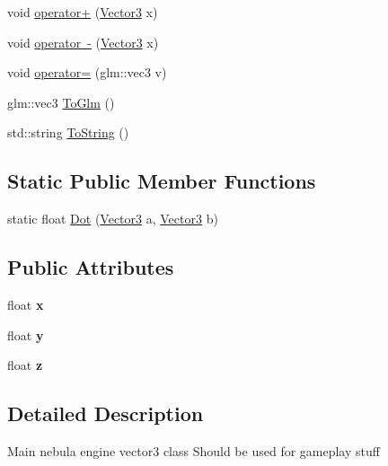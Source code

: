 \begin{DoxyCompactItemize}
\item 
void \mbox{\hyperlink{struct_vector3_a52897becbe532cb731a0117affac5ebe}{operator+}} (\mbox{\hyperlink{struct_vector3}{Vector3}} x)
\item 
void \mbox{\hyperlink{struct_vector3_aa3d4507c8c4a280d49919f1944999406}{operator -\/}} (\mbox{\hyperlink{struct_vector3}{Vector3}} x)
\item 
void \mbox{\hyperlink{struct_vector3_a11cb73f45e746e16397d4a0496d107a5}{operator=}} (glm\+::vec3 v)
\item 
glm\+::vec3 \mbox{\hyperlink{struct_vector3_a6ab2d064413018bcdfbd9d56e69d10a2}{To\+Glm}} ()
\item 
std\+::string \mbox{\hyperlink{struct_vector3_a331c8e16800919307bc3e8507f9459df}{To\+String}} ()
\end{DoxyCompactItemize}
\subsection*{Static Public Member Functions}
\begin{DoxyCompactItemize}
\item 
static float \mbox{\hyperlink{struct_vector3_abc6241be068bbf878c7b12b16582a1f4}{Dot}} (\mbox{\hyperlink{struct_vector3}{Vector3}} a, \mbox{\hyperlink{struct_vector3}{Vector3}} b)
\end{DoxyCompactItemize}
\subsection*{Public Attributes}
\begin{DoxyCompactItemize}
\item 
\mbox{\label{struct_vector3_a7e2d3237b29a2f29d7b3d8b2934e35f2}} 
float {\bfseries x}
\item 
\mbox{\label{struct_vector3_a86eb35a9fa2d5a49e7fad66a35fa9c13}} 
float {\bfseries y}
\item 
\mbox{\label{struct_vector3_aa8c9461eb24bd2c364258078811a3e9d}} 
float {\bfseries z}
\end{DoxyCompactItemize}


\subsection{Detailed Description}
Main nebula engine vector3 class Should be used for gameplay stuff 

